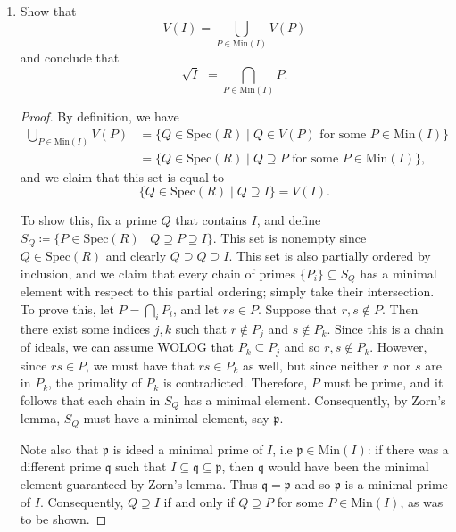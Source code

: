 \documentclass[11pt,oneside,english]{amsart}
\theoremstyle{definition}
\newcommand{\lspace}{\vspace{5mm}}
\newcommand{\MF}[1]{\mathfrak{#1}}
\begin{document}
\rightline{\today}

\lspace




\begin{enumerate}[leftmargin=*]
\itemsep5mm



\item Show that
\[
V(I) = \bigcup_{P \in \textrm{Min}(I)} V(P)
\]
and conclude that
\[
\sqrt{I} \,\, = \bigcap_{P \in \textrm{Min}(I)} P.
\]
\begin{proof}
By definition, we have
\begin{align*}
\bigcup_{P \in \text{Min}(I)} V(P)&=\{Q\in\text{Spec}(R)\mid Q\in V(P)\text{ for some }P\in\text{Min}(I)\}\\[2mm]
&=\{Q\in\text{Spec}(R)\mid Q\supseteq P\text{ for some }P\in\text{Min}(I)\},
\end{align*}
and we claim that this set is equal to 
\[
\{Q\in\text{Spec}(R)\mid Q\supseteq I\}=V(I).
\]



To show this, fix a prime $Q$ that contains $I$, and define $S_Q\coloneqq\{P\in\text{Spec}(R)\mid Q\supseteq P\supseteq I\}$. This set is nonempty since $Q\in\text{Spec}(R)$ and clearly $Q\supseteq Q\supseteq I$. This set is also partially ordered by inclusion, and we claim that every chain of primes $\{P_i\}\subseteq S_Q$ has a minimal element with respect to this partial ordering; simply take their intersection. To prove this, let $P=\bigcap_iP_i$, and let $rs\in P$. Suppose that $r,s\notin P$. Then there exist some indices $j,k$ such that $r\notin P_j$ and $s\notin P_k$. Since this is a chain of ideals, we can assume WOLOG that $P_k\subseteq P_j$ and so $r,s\notin P_k$. However, since $rs\in P$, we must have that $rs\in P_k$ as well, but since neither $r$ nor $s$ are in $P_k$, the primality of $P_k$ is contradicted. Therefore, $P$ must be prime, and it follows that each chain in $S_Q$ has a minimal element. Consequently, by Zorn's lemma, $S_Q$ must have a minimal element, say $\MF{p}$. 

Note also that $\MF{p}$ is ideed a minimal prime of $I$, i.e $\MF{p}\in\text{Min}(I)$: if there was a different prime $\MF{q}$ such that $I\subseteq\MF{q}\subseteq \MF{p}$, then $\MF{q}$ would have been the minimal element guaranteed by Zorn's lemma. Thus $\MF{q}=\MF{p}$ and so $\MF{p}$ is a minimal prime of $I$. Consequently, $Q\supseteq I$ if and only if $Q\supseteq P$ for some $P\in\text{Min}(I)$, as was to be shown.


\end{proof}
\end{enumerate}
\end{document}
